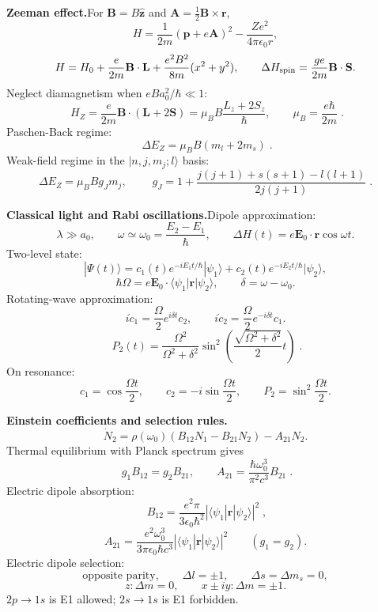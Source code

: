 \noindent\textbf{Zeeman effect.}\quad For $\mathbf B=B\hat{\mathbf z}$ and
$\mathbf A=\frac12\mathbf B\times\mathbf r$,
\[
H=\frac1{2m}(\mathbf p+e\mathbf A)^2-\frac{Ze^2}{4\pi\epsilon_0r},
\]
\[
H=H_0+\frac{e}{2m}\mathbf B\cdot\mathbf L
+\frac{e^2B^2}{8m}(x^2+y^2),\qquad
\Delta H_{\rm spin}=\frac{ge}{2m}\mathbf B\cdot\mathbf S.
\]
Neglect diamagnetism when $eBa_0^2/\hbar\ll1$:
\[
\boxed{\;H_Z=\frac{e}{2m}\mathbf B\cdot(\mathbf L+2\mathbf S)
=\mu_BB\frac{L_z+2S_z}{\hbar},\qquad
\mu_B=\frac{e\hbar}{2m}\;}.
\]
Paschen-Back regime:
\[
\boxed{\;\Delta E_Z=\mu_BB(m_l+2m_s)\;}.
\]
Weak-field regime in the $|n,j,m_j;l\rangle$ basis:
\[
\Delta E_Z=\mu_BBg_Jm_j,\qquad
\boxed{\;g_J=1+\frac{j(j+1)+s(s+1)-l(l+1)}{2j(j+1)}\;}.
\]

\noindent\textbf{Classical light and Rabi oscillations.}\quad Dipole approximation:
\[
\lambda\gg a_0,\qquad \omega\simeq\omega_0=\frac{E_2-E_1}{\hbar},\qquad
\Delta H(t)=e\mathbf E_0\cdot\mathbf r\cos\omega t.
\]
Two-level state:
\[
|\Psi(t)\rangle=c_1(t)e^{-iE_1t/\hbar}|\psi_1\rangle
+c_2(t)e^{-iE_2t/\hbar}|\psi_2\rangle,
\]
\[
\hbar\Omega=e\mathbf E_0\cdot\langle\psi_1|\mathbf r|\psi_2\rangle,\qquad
\delta=\omega-\omega_0.
\]
Rotating-wave approximation:
\[
i\dot c_1=\frac{\Omega}{2}e^{i\delta t}c_2,\qquad
i\dot c_2=\frac{\Omega}{2}e^{-i\delta t}c_1.
\]
\[
\boxed{\;P_2(t)=\frac{\Omega^2}{\Omega^2+\delta^2}
\sin^2\left(\frac{\sqrt{\Omega^2+\delta^2}}{2}t\right)\;}.
\]
On resonance:
\[
c_1=\cos\frac{\Omega t}{2},\qquad c_2=-i\sin\frac{\Omega t}{2},\qquad
P_2=\sin^2\frac{\Omega t}{2}.
\]

\noindent\textbf{Einstein coefficients and selection rules.}\quad
\[
\dot N_2=\rho(\omega_0)(B_{12}N_1-B_{21}N_2)-A_{21}N_2.
\]
Thermal equilibrium with Planck spectrum gives
\[
\boxed{\;g_1B_{12}=g_2B_{21},\qquad
A_{21}=\frac{\hbar\omega_0^3}{\pi^2c^3}B_{21}\;}.
\]
Electric dipole absorption:
\[
\boxed{\;B_{12}=\frac{e^2\pi}{3\epsilon_0\hbar^2}
|\langle\psi_1|\mathbf r|\psi_2\rangle|^2\;},
\]
\[
A_{21}=\frac{e^2\omega_0^3}{3\pi\epsilon_0\hbar c^3}
|\langle\psi_1|\mathbf r|\psi_2\rangle|^2\qquad(g_1=g_2).
\]
Electric dipole selection:
\[
\text{opposite parity},\qquad \Delta l=\pm1,\qquad
\Delta s=\Delta m_s=0,
\]
\[
z:\Delta m=0,\qquad x\pm iy:\Delta m=\pm1.
\]
$2p\to1s$ is E1 allowed; $2s\to1s$ is E1 forbidden.

